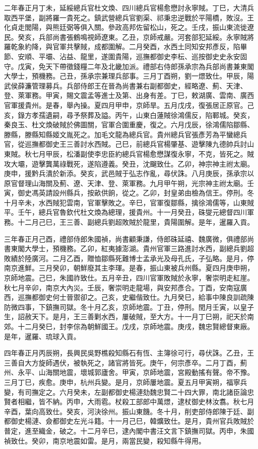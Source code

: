 二年春正月丁未，延綏總兵官杜文煥、四川總兵官楊愈懋討永寧賊。丁巳，大清兵取西平堡，副將羅一貴死之。鎮武營總兵官劉渠、祁秉忠逆戰於平陽橋，敗沒。王化貞走閭陽，與熊廷弼等俱入關。參政高邦佐留松山，死之。壬戌，振山東流徙遼民。癸亥，兵部尚書張鶴鳴視師遼東。乙丑，京師戒嚴。河套部犯延綏。永寧賊將羅乾象約降，與官軍共擊賊，成都圍解。二月癸酉，水西土同知安邦彥反，陷畢節、安順、平壩、沾益、龍里，遂圍貴陽，巡撫都御史李枟、巡按御史史永安固守。戊寅，免天下帶徵錢糧二年及北畿加派。禮部右侍郎孫承宗為兵部尚書兼東閣大學士，預機務。己丑，孫承宗兼理兵部事。三月丁酉朔，劉一燝致仕。甲辰，陽武侯薛濂管理募兵。兵部侍郎王在晉為尚書兼右副都御史，經略遼、薊、天津、登、萊軍務。甲寅，賜文震孟等進士及第、出身有差。丁巳，敕湖廣、雲南、廣西官軍援貴州。是春，舉內操。夏四月甲申，京師旱。五月戊戌，復張居正原官。己亥，錄方孝孺遺嗣，尋予祭葬及謚。丙午，山東白蓮賊徐鴻儒反，陷鄆城。癸亥，秦良玉、杜文煥破賊於佛圖關，官軍合圍重慶，復之。六月戊辰，徐鴻儒陷鄒縣、滕縣，滕縣知縣姬文胤死之。加毛文龍為總兵官。貴州總兵官張彥芳為平蠻總兵官，從巡撫都御史王三善討水西賊。己巳，前總兵官楊肇基、遊擊陳九德帥兵討山東賊。秋七月甲辰，松潘副使李忠臣約總兵官楊愈懋謀復永寧，不克，皆死之。賊攻大壩，遊擊龔萬祿戰死，遂陷遵義。癸丑，沈飀致仕。乙卯，神宗神主祔太廟。庚申，援黔兵潰於新添。癸亥，武邑賊于弘志作亂，尋伏誅。八月庚辰，孫承宗以原官督理山海關及薊、遼、天津、登、萊軍務。九月甲午朔，光宗神主祔太廟。壬寅，御史馮英請設州縣兵，按畝供餉，從之。乙卯，封皇弟由檢為信王。停刑。冬十月辛未，水西賊犯雲南，官軍擊敗之。辛巳，官軍復鄒縣，擒徐鴻儒等，山東賊平。壬午，總兵官魯欽代杜文煥為總理，援貴州。十一月癸丑，硃燮元總督四川軍務。十二月己巳，王三善、副總兵劉超敗賊於龍里，貴陽圍解。是年，暹羅入貢。

三年春正月己酉，禮部侍郎朱國禎，尚書顧秉謙，侍郎硃延禧、魏廣微，俱禮部尚書東閣大學士，預機務。乙卯，紅夷據澎湖。貴州官軍三路進討水西，副總兵劉超敗績於陸廣河。二月乙酉，贈恤鄒縣死難博士孟承光及母孔氏，子弘略。是月，停南京進鮮。三月癸卯，朝鮮廢其主李琿。是春，振山東被兵州縣。夏四月庚申朔，京師地震。己巳，朱國祚致仕。五月辛丑，四川官軍敗賊於永寧，奢崇明走紅崖。秋七月辛卯，南京大內災。壬辰，奢崇明走龍場，與安邦彥合。丁酉，安南寇廣西，巡撫都御史何士晉禦卻之。己亥，史繼偕致仕。九月癸巳，給事中陳良訓疏陳防微四事，下鎮撫司獄。冬十月乙亥，京師地震。丁丑，停刑。閏月壬寅，以皇子生，詔赦天下。是月，王三善剿水西，屢破賊，至大方。十一月丁巳朔，祀天於南郊。十二月癸巳，封李倧為朝鮮國王。戊戌，京師地震。庚戌，魏忠賢總督東廠。是年，暹羅、琉球入貢。

四年春正月丙辰朔，長興民吳野樵殺知縣石有恆、主簿徐可行，尋伏誅。乙丑，王三善自大方旋師遇伏，被執死之，諸官將皆死。庚午，何宗彥卒。二月丁酉，薊州、永平、山海關地震，壞城郭廬舍。甲寅，京師地震，宮殿動搖有聲。帝不豫。三月丁巳，疾愈。庚申，杭州兵變。是月，京師屢地震。夏五月甲寅朔，福寧兵變，有司撫定之。六月癸未，左副都御史楊漣劾魏忠賢二十四大罪，南北諸臣論忠賢者相繼，皆不納。丙申，大雨雹。杖殺工部郎中萬燝，逮杖御史林汝翥。秋七月辛酉，葉向高致仕。癸亥，河決徐州。振山東饑。冬十月，削吏部侍郎陳于廷、副都御史楊漣、僉都御史左光斗籍。十一月己巳，韓爌致仕。是月，貴州官兵敗賊於普定，進至織金，破之。十二月辛巳，逮內閣中書汪文言下鎮撫司獄。丙申，朱國禎致仕。癸卯，南京地震如雷。是月，兩當民變，殺知縣牛得用。

